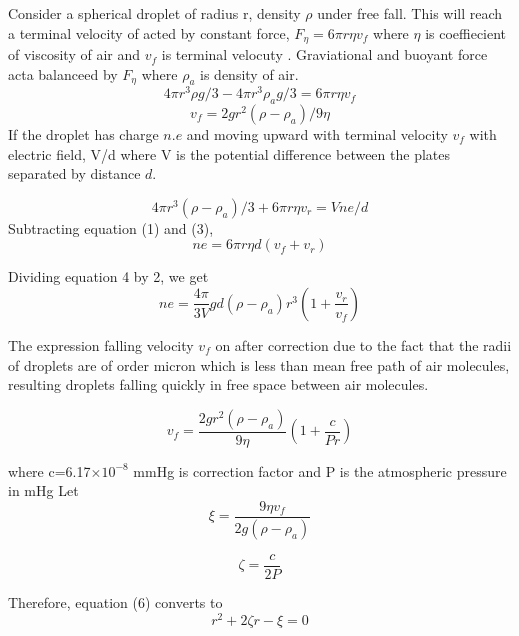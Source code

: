 \documentclass[a4paper, amsfonts, amssymb, amsmath, reprint, showkeys, nofootinbib, twoside]{revtex4-1}
\begin{document}
Consider a spherical droplet of radius r, density $\rho$ under free fall. This will reach a terminal velocity of acted by constant force, $F_\eta=6\pi r\eta v_f$ where $\eta$ is coeffiecient of viscosity of air and $v_f$ is terminal velocuty . Graviational and buoyant force acta balanceed by $F_\eta$ where $\rho_a$ is density of air.
\begin{equation}
	4\pi r^3\rho g/3 -4\pi r^3\rho_a g/3=6\pi r\eta v_f
\end{equation}
\begin{equation}
	v_f=2g r^2(\rho  -\rho_a) /9\eta
\end{equation}
If the droplet has charge $n.e$ and moving upward with terminal velocity $v_f$ with electric field, V/d where V is the potential difference between the plates separated by distance $d$. 

\begin{equation}
	4\pi r^3(\rho  -\rho_a)/3+6\pi r\eta v_r=Vne/d
\end{equation} 
Subtracting equation (1) and (3), 
\begin{equation}
	ne=6\pi r\eta d(v_f+v_r)
\end{equation}

Dividing equation 4 by 2, we get
\begin{equation}
	ne=\frac{4\pi}{3V} gd(\rho  -\rho_a)r^3\left( 1+\frac{v_r}{v_f}\right) 
\end{equation}

The expression falling velocity $v_f$ on after correction due to the fact that the radii of droplets are of order micron which is less than mean free path of air molecules, resulting droplets falling quickly in free space between air molecules.

\begin{equation}
	v_f=\frac{2g r^2(\rho  -\rho_a)} {9\eta}\left( 1+\frac{c}{Pr}\right) 
\end{equation}

where c=6.17$\times10^{-8}$ mmHg is correction factor and P is the atmospheric pressure in mHg
Let 
\begin{equation}
\xi=\frac{9\eta v_f}{2g(\rho  -\rho_a)}
\end{equation}

\begin{equation}
	\zeta=\frac{c}{2P}
\end{equation}

Therefore, equation (6) converts to 
\begin{equation}
	r^2+2\zeta r-\xi=0
\end{equation}
\end{document}
